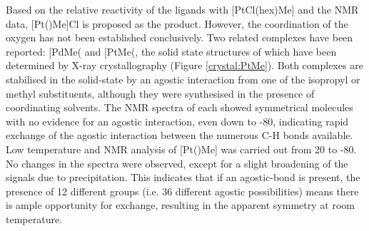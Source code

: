 
Based on the relative reactivity of the \tBuxantphos{} ligands with [PtCl(\acrshort{hex})Me] and the NMR data, [Pt(\tBuxantphos)Me]Cl is proposed as the product.  However, the coordination of the oxygen has not been established conclusively.  Two related complexes have been reported: [PdMe(\ce{P^{t}Bu3)2]+} and [PtMe(\ce{P^{i}Pr3)2]+}, the solid state structures of which have been determined by X-ray crystallography (Figure \ref{crystal:PtMe}).\cite{Ingleson2004, Walter2013}  Both complexes are stabilised in the solid-state by an agostic interaction from one of the isopropyl or \tBu{} methyl substituents, although they were synthesised in the presence of coordinating solvents.  The NMR spectra of each showed symmetrical molecules with no evidence for an agostic interaction, even down to -80\degC, indicating rapid exchange of the agostic interaction between the numerous C-H bonds available.  Low temperature \proton{} and \phosphorus{} NMR analysis of [Pt(\tBusixantphos)Me] was carried out from 20 to -80\degC.  No changes in the spectra were observed, except for a slight broadening of the signals due to precipitation.  This indicates that if an agostic-bond is present, the presence of 12 different \tBu{}  groups (i.e. 36 different agostic possibilities) means there is ample opportunity for exchange, resulting in the apparent symmetry at room temperature.  

